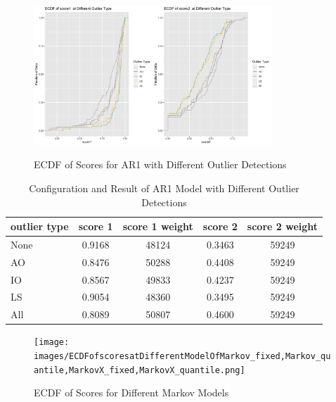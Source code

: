 \documentclass{article}
\begin{document}
\begin{figure}[htbp]
\caption{ECDF of Scores for AR1 with Different Outlier Detections}
\centering
\includegraphics[width = 0.8\textwidth]{images/ECDFofscoresatDifferentOutlierTypeOfAR1,840,1,3.png}
\label{fig:fig1.3.4}
\end{figure}

\begin{table}[htbp]
  \begin{center}
    \caption{Configuration and Result of AR1 Model with Different Outlier Detections}
    \label{tab:tab1.3.4}
    \begin{tabular}{l|*{4}{c}}
      \textbf{outlier type} & \textbf{score 1} & \textbf{score 1 weight} & \textbf{score 2} & \textbf{score 2 weight} \\
      \hline
      None & 0.9168 & 48124 & 0.3463 & 59249\\
      AO & 0.8476 & 50288 & 0.4408 & 59249\\
      IO & 0.8567 & 49833 & 0.4237 & 59249\\
      LS & 0.9054 & 48360 & 0.3495 & 59249\\
      All & 0.8089 & 50807 & 0.4600 & 59249\\
    \end{tabular}
  \end{center}
\end{table}

\begin{figure}[htbp]
\caption{ECDF of Scores for Different Markov Models}
\centering
\texttt{[image: images/ECDFofscoresatDifferentModelOfMarkov\_fixed,Markov\_quantile,MarkovX\_fixed,MarkovX\_quantile.png]}
\label{fig:fig1.3.5}
\end{figure}
\end{document}
